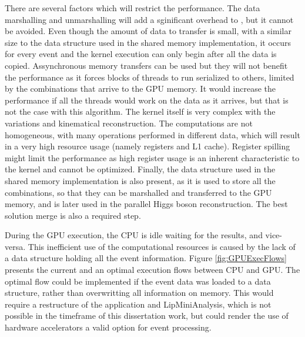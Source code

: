 There are several factors which will restrict the performance. The data marshalling and unmarshalling will add a sginificant overhead to \ttDilepKinFit, but it cannot be avoided. Even though the amount of data to transfer is small, with a similar size to the data structure used in the shared memory implementation, it occurs for every event and the kernel execution can only begin after all the data is copied. Assynchronous memory transfers can be used but they will not benefit the performance as it forces blocks of threads to run serialized to others, limited by the combinations that arrive to the GPU memory. It would increase the performance if all the threads would work on the data as it arrives, but that is not the case with this algorithm. The kernel itself is very complex with the variations and kinematical reconstruction. The computations are not homogeneous, with many operations performed in different data, which will result in a very high resource usage (namely registers and L1 cache). Register spilling might limit the performance as high register usage is an inherent characteristic to the kernel and cannot be optimized. Finally, the data structure used in the shared memory implementation is also present, as it is used to store all the combinations, so that they can be marshalled and transferred to the GPU memory, and is later used in the parallel Higgs boson reconstruction. The best solution merge is also a required step.

During the GPU execution, the CPU is idle waiting for the results, and vice-versa. This inefficient use of the computational resources is caused by the lack of a data structure holding all the event information. Figure \ref{fig:GPUExecFlows} presents the current and an optimal execution flows between CPU and GPU. The optimal flow could be implemented if the event data was loaded to a data structure, rather than overwritting all information on memory. This would require a restructure of the application and LipMiniAnalysis, which is not possible in the timeframe of this dissertation work, but could render the use of hardware accelerators a valid option for event processing.

